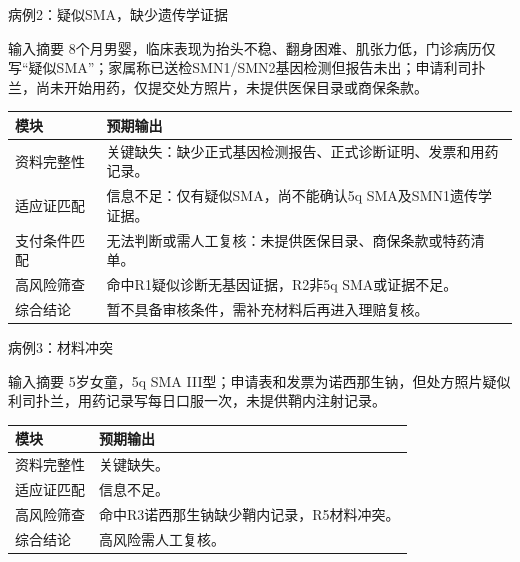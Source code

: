 \documentclass{beamer}
\begin{document}
\begin{frame}[fragile]{病例2：疑似SMA，缺少遗传学证据}
  \begin{block}{输入摘要}
    8个月男婴，临床表现为抬头不稳、翻身困难、肌张力低，门诊病历仅写“疑似SMA”；家属称已送检SMN1/SMN2基因检测但报告未出；申请利司扑兰，尚未开始用药，仅提交处方照片，未提供医保目录或商保条款。\cite{iwayama2025delayed}
  \end{block}
  
  \vspace{0.5em} %
  
  \footnotesize 
  \begin{tabularx}{\textwidth}{l X}
    \toprule
    模块 & 预期输出 \\
    \midrule
    资料完整性 & 关键缺失：缺少正式基因检测报告、正式诊断证明、发票和用药记录。 \\
    适应证匹配 & 信息不足：仅有疑似SMA，尚不能确认5q SMA及SMN1遗传学证据。 \\
    支付条件匹配 & 无法判断或需人工复核：未提供医保目录、商保条款或特药清单。 \\
    高风险筛查 & 命中R1疑似诊断无基因证据，R2非5q SMA或证据不足。 \\
    综合结论 & 暂不具备审核条件，需补充材料后再进入理赔复核。 \\
    \bottomrule
  \end{tabularx}
\end{frame}

\begin{frame}[fragile]{病例3：材料冲突}
  \begin{block}{输入摘要}
    5岁女童，5q SMA III型；申请表和发票为诺西那生钠，但处方照片疑似利司扑兰，用药记录写每日口服一次，未提供鞘内注射记录。
  \end{block}
  \begin{tabularx}{\textwidth}{l X}
    \toprule
    模块 & 预期输出 \\
    \midrule
    资料完整性 & 关键缺失。 \\
    适应证匹配 & 信息不足。 \\
    高风险筛查 & 命中R3诺西那生钠缺少鞘内记录，R5材料冲突。 \\
    综合结论 & 高风险需人工复核。 \\
    \bottomrule
  \end{tabularx}
\end{frame}
\end{document}
